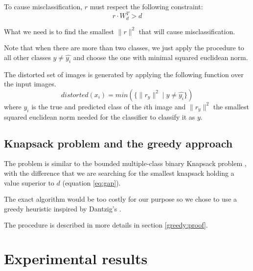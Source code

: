 \documentclass{article} %
\begin{document}
To cause misclassification, $r$ must respect the following constraint:
\begin{equation}
\label{eq:noise_threshold}
  r \cdot W_d^T > d
\end{equation}

What we need is to find the smallest $ \lVert{r} \rVert^2$ that will cause
misclassification. 

Note that when there are more than two classes, we just
apply the procedure to all other classes $y \neq \widehat{y_i}$ and choose the one with minimal squared euclidean norm.

The distorted set of images is generated by applying the following function over
the input images.
\begin{equation}
	\label{robustness}
	distorted(x_i) = min(\{\lVert{r_{y}} \rVert^2 \mid y \neq \widehat{y_i}\})
\end{equation}
where $\widehat{y_i}$ is the true and predicted class of the $i$th image and $\lVert{r_{y}} \rVert^2$ the smallest squared euclidean norm needed for the classifier to classify it as $y$.


\subsection{Knapsack problem and the greedy approach}

The problem is similar to the bounded multiple-class binary Knapsack problem
\citep{vanderbeck_extending_2002}, with the difference that we are searching
for the smallest knapsack holding a value superior to $d$ (equation
\ref{eq:gap}).

The exact algorithm would be too costly for our purpose so we chose to use a
greedy heuristic inspired by Dantzig's \citep{dantzig_discrete-variable_1957}.

The procedure is described in more details in section \ref{greedy:proof}.



\section{Experimental results}



\end{document}
